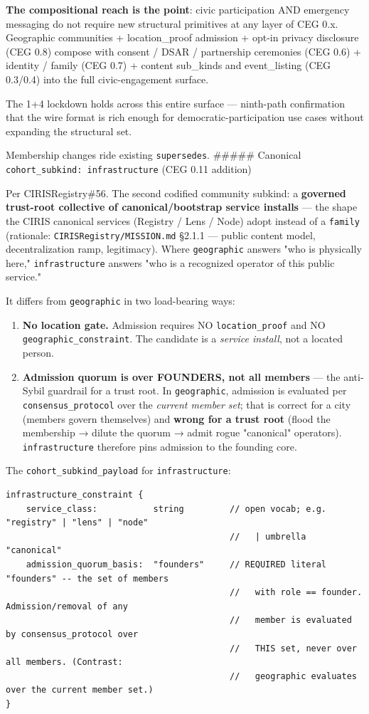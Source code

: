 \documentclass[11pt]{article}
\begin{document}
\textbf{The compositional reach is the point}: civic participation AND emergency messaging do not require new structural primitives at any layer of CEG 0.x. Geographic communities + location\_proof admission + opt-in privacy disclosure (CEG 0.8) compose with consent / DSAR / partnership ceremonies (CEG 0.6) + identity / family (CEG 0.7) + content sub\_kinds and event\_listing (CEG 0.3/0.4) into the full civic-engagement surface.


The 1+4 lockdown holds across this entire surface — ninth-path confirmation that the wire format is rich enough for democratic-participation use cases without expanding the structural set.


Membership changes ride existing \texttt{supersedes}. \#\#\#\#\# Canonical \texttt{cohort\_subkind: infrastructure} (CEG 0.11 addition)


Per CIRISRegistry\#56. The second codified community subkind: a \textbf{governed trust-root collective of canonical/bootstrap service installs} — the shape the CIRIS canonical services (Registry / Lens / Node) adopt instead of a \texttt{family} (rationale: \texttt{CIRISRegistry/MISSION.md} §2.1.1 — public content model, decentralization ramp, legitimacy). Where \texttt{geographic} answers "who is physically here," \texttt{infrastructure} answers "who is a recognized operator of this public service."


It differs from \texttt{geographic} in two load-bearing ways:


\begin{enumerate}\setlength\itemsep{0pt}
\item \textbf{No location gate.} Admission requires NO \texttt{location\_proof} and NO \texttt{geographic\_constraint}. The candidate is a \textit{service install}, not a located person.
\item \textbf{Admission quorum is over FOUNDERS, not all members} — the anti-Sybil guardrail for a trust root. In \texttt{geographic}, admission is evaluated per \texttt{consensus\_protocol} over the \textit{current member set}; that is correct for a city (members govern themselves) and \textbf{wrong for a trust root} (flood the membership → dilute the quorum → admit rogue "canonical" operators). \texttt{infrastructure} therefore pins admission to the founding core.
\end{enumerate}


The \texttt{cohort\_subkind\_payload} for \texttt{infrastructure}:


\begin{lstlisting}
infrastructure_constraint {
    service_class:           string         // open vocab; e.g. "registry" | "lens" | "node"
                                            //   | umbrella "canonical"
    admission_quorum_basis:  "founders"     // REQUIRED literal "founders" -- the set of members
                                            //   with role == founder. Admission/removal of any
                                            //   member is evaluated by consensus_protocol over
                                            //   THIS set, never over all members. (Contrast:
                                            //   geographic evaluates over the current member set.)
}
\end{lstlisting}
\end{document}
